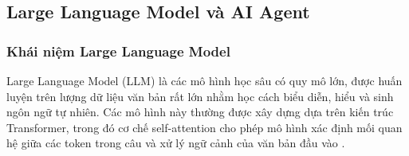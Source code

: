 


    
    
    


\subsection{Large Language Model và AI Agent}

\subsubsection{Khái niệm Large Language Model}

Large Language Model (LLM) là các mô hình học sâu có quy mô lớn, được huấn luyện trên lượng dữ liệu văn bản rất lớn nhằm học cách biểu diễn, hiểu và sinh ngôn ngữ tự nhiên. Các mô hình này thường được xây dựng dựa trên kiến trúc Transformer, trong đó cơ chế self-attention cho phép mô hình xác định mối quan hệ giữa các token trong câu và xử lý ngữ cảnh của văn bản đầu vào \parencite{vaswani2017attention}.

